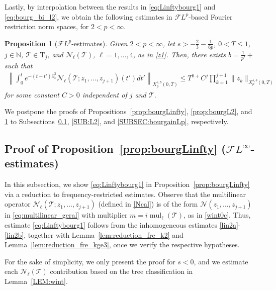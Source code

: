 \documentclass[a4paper,
11pt,  reqno]{amsart}
\newcommand{\5}{\textup{V}}
\newcommand{\FL}{\mathcal{F} L}
\newcommand{\dx}{\partial_x}
\newtheorem{proposition}[theorem]{Proposition}
\theoremstyle{remark}
\newcommand{\TT}{\mathcal{T}}
\newcommand{\Tr}{\mathrm{T}}
\renewcommand{\l}{\ell}
\newcommand{\N}{\mathbb{N}}
\DeclareMathOperator{\mul}{mul}
\numberwithin{equation}{section}
\numberwithin{theorem}{section}
\newcommand{\Ncal}{\mathcal{N}}
\begin{document}
Lastly, by interpolation between the results in \eqref{eq:Linftybourg1} and \eqref{eq:bourg_bi_l2}, we obtain the following estimates in $\FL^{p}$-based Fourier restriction norm spaces, for $2 < p <\infty$.




\begin{proposition}[$\FL^p$-estimates]\label{prop:bourgLp}
Given $2 < p <\infty$, let $s>-\frac{2}{3}-\frac{1}{6p}$, $0<T \le 1$, $j\in\N$,  $\TT\in \Tr_{j}$, and $\Ncal_\l(\TT)$, $\l=1,\dots, 4$, as in \eqref{z1}. Then,
there exists $b=\frac{1}{p'}+$ such that
	\begin{align}\label{eq:bourg_bi_lp}
		\left\|\int_0^t e^{-(t-t')\dx^3} \Ncal_\l(\TT; z_1,\dots, z_{j+1})(t') dt'  \right\|_{X^{s,b}_{p}(0,T)}
        \le T^{0+} C^j\prod_{k=1}^{j+1}\|z_k\|_{X^{s,b}_{p}(0,T)}
	\end{align}
    for some constant $C>0$ independent of $j$ and $\TT$.
\end{proposition}




We postpone the proofs of Propositions~\ref{prop:bourgLinfty}, \ref{prop:bourgL2}, and \ref{prop:bourgLp} to Subsections~\ref{SUB:Linfty}, \ref{SUB:L2}, and \ref{SUBSEC:bourgainLp}, respectively.




\subsection{Proof of Proposition~\ref{prop:bourgLinfty} ($\FL^\infty$-estimates)}
\label{SUB:Linfty}



{
In this subsection, we show \eqref{eq:Linftybourg1} in Proposition~\ref{prop:bourgLinfty} via a reduction to frequency-restricted estimates.
Observe that the multilinear operator
$\Ncal_\l(\TT; z_1, \ldots, z_{j+1})$ (defined in \eqref{Ncal}) is of the form $\Ncal(z_1, \ldots, z_{j+1})$ in \eqref{eq:multilinear_geral} with multiplier $m=i \mul_\l(\TT)$, as in \eqref{wint0c}.
 Thus, estimate  \eqref{eq:Linftybourg1}  follows from the inhomogeneous estimates \eqref{lin2a}-\eqref{lin2b}, together with Lemma~\ref{lem:reduction_fre_k2} and Lemma~\ref{lem:reduction_fre_kge3}, once we verify the respective hypotheses.

 For the sake of simplicity, we only present the proof for $s<0$, and we estimate each $\Ncal_\l(\TT)$ contribution based on the tree classification in Lemma~\ref{LEM:wint}.
}
\end{document}
